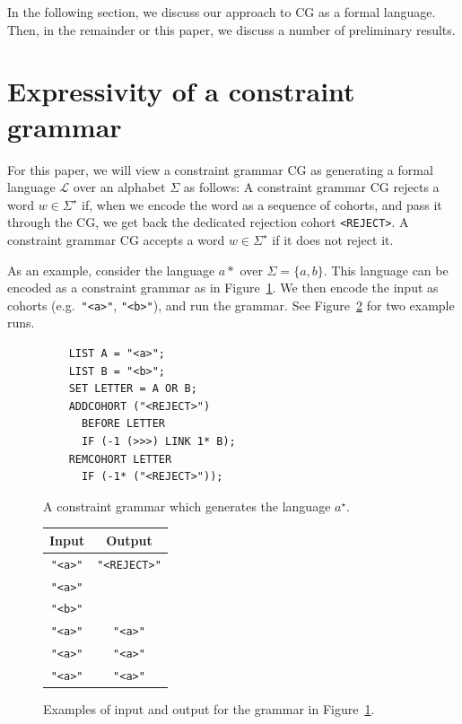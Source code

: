 \documentclass[11pt]{article}
\def\t#1{\texttt{#1}}
\begin{document}
In the following section, we discuss our approach to CG as a formal language.
Then, in the remainder or this paper, we discuss a number of preliminary
results.

\section{Expressivity of a constraint grammar}

For this paper, we will view a constraint grammar CG as generating a formal
language $\mathcal{L}$ over an alphabet $\Sigma$ as follows:
A constraint grammar CG rejects a word $w \in \Sigma^\star$ if, when we encode
the word as a sequence of cohorts, and pass it through the CG, we get back the
dedicated rejection cohort \texttt{<REJECT>}. A constraint grammar CG accepts a
word $w \in \Sigma^\star$ if it does not reject it. 

As an example, consider the language $a*$ over $\Sigma = \{a,b\}$. This language
can be encoded as a constraint grammar as in Figure~\ref{fig:astar}. We then
encode the input as cohorts (e.g.\ \t{"<a>"}, \t{"<b>"}), and run the grammar.
See Figure~\ref{fig:astario} for two example runs.

\begin{figure}[h]
  \begin{verbatim}
    LIST A = "<a>";
    LIST B = "<b>";
    SET LETTER = A OR B;
    ADDCOHORT ("<REJECT>")
      BEFORE LETTER 
      IF (-1 (>>>) LINK 1* B);
    REMCOHORT LETTER
      IF (-1* ("<REJECT>"));
  \end{verbatim}
  \caption{A constraint grammar which generates the language $a^\star$.}
  \label{fig:astar}
\end{figure}

\begin{figure}[h]
  \centering
  \begin{tabular}{c|c}
    \textbf{Input} & \textbf{Output} \\ \hline
    \t{"<a>"}      & \t{"<REJECT>"} \\
    \t{"<a>"}      \\
    \t{"<b>"}      \\ \hline
    \t{"<a>"}      & \t{"<a>"} \\
    \t{"<a>"}      & \t{"<a>"} \\
    \t{"<a>"}      & \t{"<a>"}
  \end{tabular}
  \caption{Examples of input and output for the grammar in
    Figure~\ref{fig:astar}.}  
  \label{fig:astario}
\end{figure}
\end{document}
